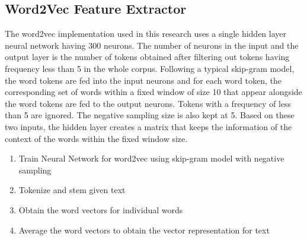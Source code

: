 \documentclass[fleqn --11pt --twoside]{IOEGC2016} %
\begin{document}
\subsection{Word2Vec Feature Extractor}
The word2vec implementation used in this research uses a single hidden layer neural network having 300 neurons. The number of neurons in the input and the output layer is the number of tokens obtained after filtering out tokens having frequency less than 5 in the whole corpus. Following a typical skip-gram model, the word tokens are fed into the input neurons and for each word token, the corresponding set of words within a fixed window of size 10 that appear alongside the word tokens are fed to the output neurons. Tokens with a frequency of less than 5 are ignored. The negative sampling size is also kept at 5. Based on these two inputs, the hidden layer creates a matrix that keeps the information of the context of the words within the fixed window size. 
\begin{enumerate}
\item Train Neural Network for word2vec using skip-gram model with negative sampling
\item Tokenize and stem given text
\item Obtain the word vectors for individual words
\item Average the word vectors to obtain the vector representation for text
\end{enumerate}
 
\end{document}
